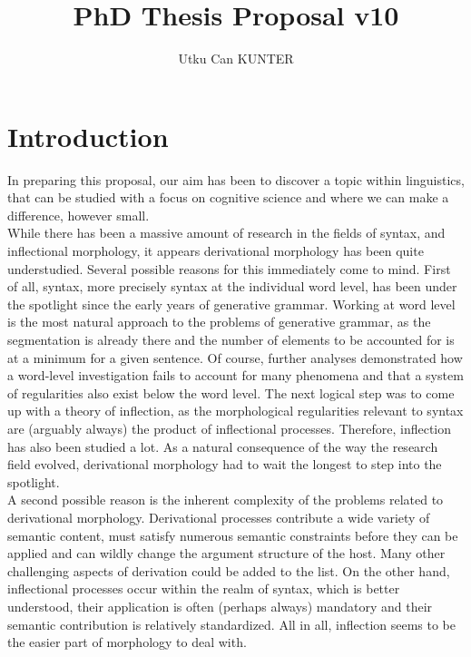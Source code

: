 \documentclass[11pt]{article} %
\title{PhD Thesis Proposal v10}
\author{Utku Can KUNTER}
\begin{document}
\maketitle

\tableofcontents

\newpage

\section{Introduction}

In preparing this proposal, our aim has been to discover a topic within linguistics, that can be studied with a focus on cognitive science and where we can make a difference, however small. \\

While there has been a massive amount of research in the fields of syntax, and inflectional morphology, it appears derivational morphology has been quite understudied. Several possible reasons for this immediately come to mind. First of all, syntax, more precisely syntax at the individual word level, has been under the spotlight since the early years of generative grammar. Working at word level is the most natural approach to the problems of generative grammar, as the segmentation is already there and the number of elements to be accounted for is at a minimum for a given sentence. Of course, further analyses demonstrated how a word-level investigation fails to account for many phenomena and that a system of regularities also exist below the word level. The next logical step was to come up with a theory of inflection, as the morphological regularities relevant to syntax are (arguably always) the product of inflectional processes. Therefore, inflection has also been studied a lot. As a natural consequence of the way the research field evolved, derivational morphology had to wait the longest to step into the spotlight. \\

A second possible reason is the inherent complexity of the problems related to derivational morphology. Derivational processes contribute a wide variety of semantic content, must satisfy numerous semantic constraints before they can be applied and can wildly change the argument structure of the host. Many other challenging aspects of derivation could be added to the list. On the other hand, inflectional processes occur within the realm of syntax, which is better understood, their application is often (perhaps always) mandatory and their semantic contribution is relatively standardized. All in all, inflection seems to be the easier part of morphology to deal with. \\
\end{document}
